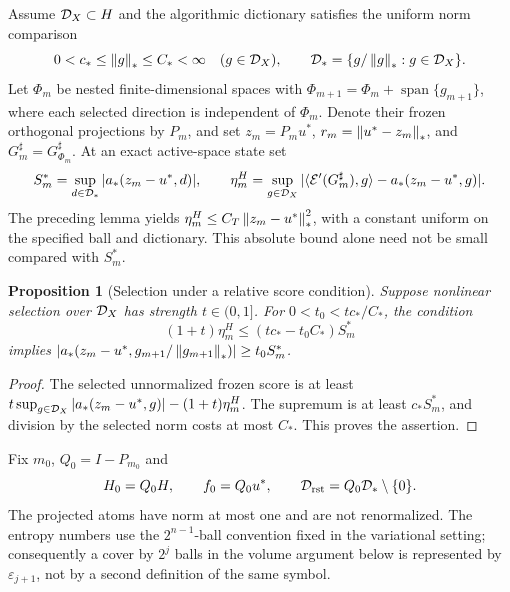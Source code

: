 \documentclass[11pt]{article}
\newtheorem{proposition}[theorem]{Proposition}
\theoremstyle{remark}
\begin{document}
Assume $\mathcal D_X\subset H$ and the algorithmic dictionary satisfies the uniform norm comparison
\begin{equation}
 0<c_*\leq\left\lVert g\right\rVert_*\leq C_*<\infty\quad(g\in\mathcal D_X),\qquad
 \mathcal D_*=\{g/\left\lVert g\right\rVert_*:g\in\mathcal D_X\}.
 \label{eq:c5-bridge}
\end{equation}
Let $\Phi_m$ be nested finite-dimensional spaces with
$\Phi_{m+1}=\Phi_m+\operatorname{span}\{g_{m+1}\}$, where each selected
direction is independent of $\Phi_m$. Denote their frozen orthogonal
projections by $P_m$, and set $z_m=P_mu^*$,
$r_m=\left\lVert u^*-z_m\right\rVert_*$, and
$G_m^\sharp=G_{\Phi_m}^\sharp$.
At an exact active-space state set
\[
 S_m^*=\sup_{d\in\mathcal D_*}|a_*(z_m-u^*,d)|,\qquad
 \eta_m^H=\sup_{g\in\mathcal D_X}
 |\langle\mathcal E'(G_m^\sharp),g\rangle-a_*(z_m-u^*,g)|.
\]
The preceding lemma yields
$\eta_m^H\leq C_T\left\lVert z_m-u^*\right\rVert_*^2$, with a constant uniform on the
specified ball and dictionary. This absolute bound alone need not be
small compared with $S_m^*$.

\begin{proposition}[Selection under a relative score condition]
\label{prop:c5-transfer}
Suppose nonlinear selection over $\mathcal D_X$ has strength $t\in(0,1]$.
For $0<t_0<tc_*/C_*$, the condition
\begin{equation}
 (1+t)\eta_m^H\leq(tc_*-t_0C_*)S_m^*
 \label{eq:c5-relative}
\end{equation}
implies
$|a_*(z_m-u^*,g_{m+1}/\left\lVert g_{m+1}\right\rVert_*)|\geq t_0S_m^*$.
\end{proposition}
\begin{proof}
The selected unnormalized frozen score is at least
$t\sup_{g\in\mathcal D_X}|a_*(z_m-u^*,g)|-(1+t)\eta_m^H$.
The supremum is at least $c_*S_m^*$, and division by the selected
norm costs at most $C_*$. This proves the assertion.
\end{proof}

Fix $m_0$, $Q_0=I-P_{m_0}$ and
\[
 H_0=Q_0H,\qquad f_0=Q_0u^*,\qquad
 \mathcal D_{\rm rst}=Q_0\mathcal D_*\setminus\{0\}.
\]
The projected atoms have norm at most one and are not renormalized.
The entropy numbers use the \(2^{n-1}\)-ball convention fixed in
the variational setting; consequently a cover by \(2^j\) balls in the
volume argument below is represented by \(\varepsilon_{j+1}\), not by a
second definition of the same symbol.
\end{document}
